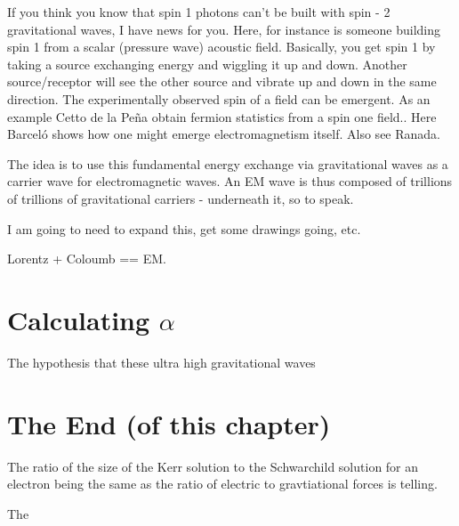 \documentclass[../rzero]{subfiles}
\begin{document}
 If you think you know that spin 1 photons can't be built with spin - 2 gravitational waves, I have news for you. Here, for instance is someone\cite{shiObservationAcousticSpin2019} building spin 1 from a scalar (pressure wave) acoustic field. Basically, you get spin 1 by taking a source exchanging energy and wiggling it up and down. Another source/receptor will see the other source and vibrate up and down in the same direction. The experimentally observed spin of a field can be emergent. As an example Cetto de la Peña obtain fermion statistics from a spin one field.\cite{cettoElectronSystemCorrelated2016}. Here Barceló\cite{barceloElectromagnetismEmergentPhenomenon2014} shows how one might emerge electromagnetism itself. Also see Ranada\cite{ranadaTopologicalTheoryElectromagnetic1989}.
 
 The idea is to use this fundamental energy exchange via gravitational waves as a carrier wave for electromagnetic waves. An EM wave is thus composed of trillions of trillions of gravitational carriers - underneath it, so to speak. 
 
 I am going to need to expand this, get some drawings going, etc. 
  
  Lorentz + Coloumb == EM. 

 \section{Calculating \texorpdfstring{$ \alpha $}{Alpha}} 
 The hypothesis that these ultra high gravitational waves 

\section{The End (of this chapter)}
The ratio of the size of the Kerr solution to the Schwarchild solution for an electron being the same as the ratio of electric to gravtiational forces is telling.

The 
\end{document}
